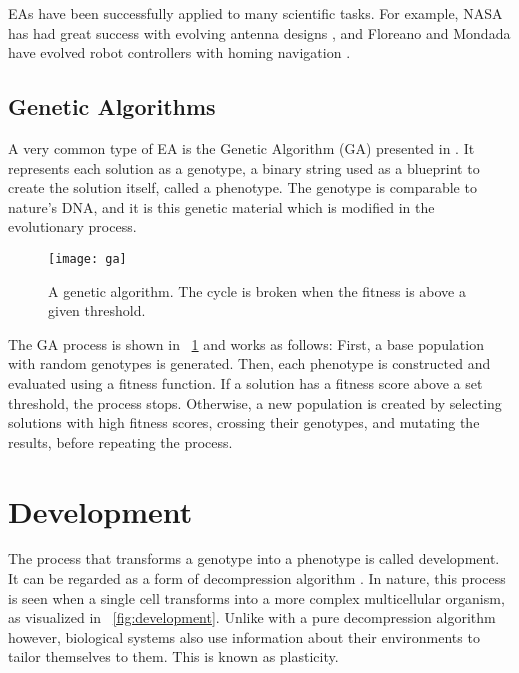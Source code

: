 EAs have been successfully applied to many scientific tasks.
For example, NASA has had great success with evolving antenna designs \cite{hornby2006antenna}, and Floreano and Mondada have evolved robot controllers with homing navigation \cite{floreano1996evolution}.

\subsection{Genetic Algorithms}

A very common type of EA is the Genetic Algorithm (GA) presented in \cite{golberg1989ga}.
It represents each solution as a genotype, a binary string used as a blueprint to create the solution itself, called a phenotype.
The genotype is comparable to nature's DNA, and it is this genetic material which is modified in the evolutionary process.

\begin{figure}[!ht]
    \centering
    \texttt{[image: ga]}
    \caption[Genetic Algorithm]{
        A genetic algorithm.
        The cycle is broken when the fitness is above a given threshold.
    }
    \label{fig:ga}
\end{figure}

The GA process is shown in \figurename~\ref{fig:ga} and works as follows:
First, a base population with random genotypes is generated.
Then, each phenotype is constructed and evaluated using a fitness function.
If a solution has a fitness score above a set threshold, the process stops.
Otherwise, a new population is created by selecting solutions with high fitness scores, crossing their genotypes, and mutating the results, before repeating the process.


\section{Development}

The process that transforms a genotype into a phenotype is called development.
It can be regarded as a form of decompression algorithm \cite{harding2008artificial}.
In nature, this process is seen when a single cell transforms into a more complex multicellular organism, as visualized in \figurename~\ref{fig:development}.
Unlike with a pure decompression algorithm however, biological systems also use information about their environments to tailor themselves to them.
This is known as plasticity.

